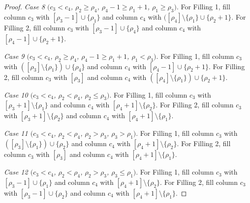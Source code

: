 \documentclass[10pt]{article}
\theoremstyle{definition}
\let\hypertargeta\hypertarget %
\newenvironment{Case}[1]{\par\vskip2pt\noindent%
\emph{#1}.}{\vskip2pt}
\begin{document}
\begin{proof}
\begin{Case}
{\hypertargeta{prop3.7case_8}{Case 8} $(c_3 < c_4$, $\rho_2\geq \rho_4$, $\rho_4-1 \geq \rho_1+1$, $\rho_1\geq \rho_3)$} 
For Filling 1, fill column $c_3$ with $[\rho_3-1]\cup \{\rho_1\}$ and column $c_4$ with $([\rho_4]\setminus\{\rho_1\}\cup \{\rho_2+1\}$. For Filling 2, fill column $c_3$ with $[\rho_3-1]\cup \{\rho_4\}$ and column $c_4$ with $[\rho_4-1]\cup \{\rho_2+1\}$.
\end{Case}

\begin{Case}
{\hypertargeta{prop3.7case_9}{Case 9} $(c_3 < c_4$, $\rho_2\geq \rho_4$, $\rho_4-1 \geq \rho_1+1$, $\rho_1< \rho_3)$} 
For Filling 1, fill column $c_3$ with $([\rho_3]\setminus \{\rho_1\})\cup \{\rho_4\}$ and column $c_4$ with $[\rho_4-1]\cup \{\rho_2+1\}$.
For Filling 2, fill column $c_3$ with $[\rho_3]$ and column $c_4$ with $([\rho_4]\setminus\{\rho_1\})\cup \{\rho_2+1\}$.
\end{Case}

\begin{Case}
{\hypertargeta{prop3.7case_10}{Case 10} $(c_3 < c_4$, $\rho_2< \rho_4$, $\rho_2 \leq \rho_3)$} 
For Filling 1, fill column $c_3$ with $[\rho_3+1]\setminus \{\rho_1\}$ and column $c_4$ with $[\rho_4+1]\setminus \{\rho_2\}$. For Filling 2, fill column $c_3$ with $[\rho_3+1]\setminus \{\rho_2\}$ and column $c_4$ with $[\rho_4+1]\setminus \{\rho_1\}$.
\end{Case}

\begin{Case}
{\hypertargeta{prop3.7case_11}{Case 11} $(c_3 < c_4$, $\rho_2< \rho_4$, $\rho_2 > \rho_3$, $\rho_3>\rho_1)$} 
For Filling 1, fill column $c_3$ with $([\rho_3]\setminus \{\rho_1\})\cup \{\rho_2\}$ and column $c_4$ with $[\rho_4+1]\setminus \{\rho_2\}$. For Filling 2, fill column $c_3$ with $[\rho_3]$ and column $c_4$ with $[\rho_4+1]\setminus \{\rho_1\}$.
\end{Case}

\begin{Case}
{\hypertargeta{prop3.7case_12}{Case 12} $(c_3 < c_4$, $\rho_2< \rho_4$, $\rho_2 > \rho_3$, $\rho_3\leq\rho_1)$} 
For Filling 1, fill column $c_3$ with $[\rho_3-1]\cup \{\rho_1\}$ and column $c_4$ with $[\rho_4+1]\setminus \{\rho_2\}$. For Filling 2, fill column $c_3$ with $[\rho_3-1]\cup \{\rho_2\}$ and column $c_4$ with $[\rho_4+1]\setminus \{\rho_1\}$.
\end{Case}


\end{proof}
\end{document}
